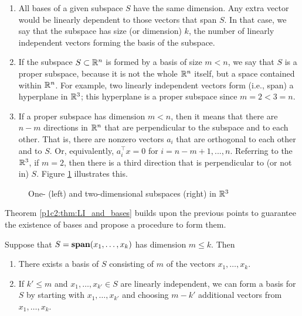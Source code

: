 \begin{enumerate}
	\item All bases of a given subspace $S$ have the same dimension. Any extra vector would be linearly dependent to those vectors that span $S$. In that case, we say that the subspace has size (or dimension) $k$, the number of linearly independent vectors forming the basis of the subspace.
	\item If the subspace $S \subset \mathbb{R}^n$ is formed by a basis of size $m < n$, we say that $S$ is a proper subspace, because it is not the whole $\mathbb{R}^n$ itself, but a space contained within $\mathbb{R}^n$. For example, two linearly independent vectors form (i.e., span) a hyperplane in $\mathbb{R}^3$; this hyperplane is a proper subspace since $m=2 <3=n$.
	\item If a proper subspace has dimension $m < n$, then it means that there are $n-m$ directions in $\mathbb{R}^n$ that are perpendicular to the subspace and to each other. That is, there are nonzero vectors $a_i$ that are orthogonal to each other and to $S$. Or, equivalently, $a_i^\top x = 0$ for $i = n-m + 1, ..., n$. Referring to the $\mathbb{R}^3$, if $m=2$, then there is a third direction that is perpendicular to (or not in) $S$. Figure \ref{p1c2:fig:proper_subpaces} illustrates this.
\end{enumerate}

\begin{figure}
	\centering
	\vspace{-12pt}
	\caption{One- (left) and two-dimensional subspaces (right) in $\mathbb{R}^3$} \label{p1c2:fig:proper_subpaces}
\end{figure}

Theorem \ref{p1c2:thm:LI_and_bases} builds upon the previous points to guarantee the existence of bases and propose a procedure to form them.

\begin{theorem}\label{p1c2:thm:LI_and_bases}
	Suppose that $S = \mathop{\bf span}(x_1,\dots, x_k)$ has dimension $m \leq k$. Then
	\begin{enumerate}
		\item There exists a basis of $S$ consisting of $m$ of the vectors $x_1,\dots, x_k$.
		\item If $k' \leq m$ and $x_1,\dots, x_{k'} \in S$ are linearly independent, we can form a basis for $S$ by starting with $x_1,\dots, x_{k'}$ and choosing $m-{k'}$ additional vectors from $x_1,\dots, x_k$.
	\end{enumerate}	
\end{theorem}

